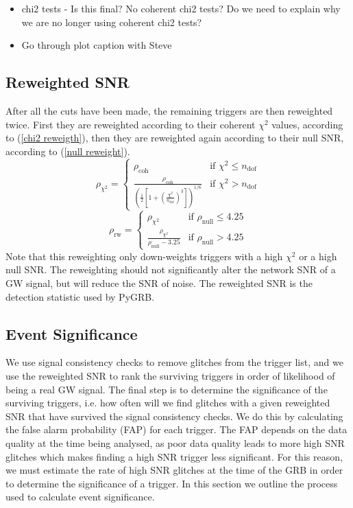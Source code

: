 \documentclass[11pt]{cuthesis}
\begin{document}
\begin{itemize}
\item chi2 tests - Is this final? No coherent chi2 tests? Do we need to explain why we are no longer using coherent chi2 tests? 
\item Go through plot caption with Steve
\end{itemize}

\subsection{Reweighted SNR} \label{sec:reweighted snr}
After all the cuts have been made, the remaining triggers are then reweighted twice. First they are reweighted according to their coherent $\chi^2$ values, according to (\ref{chi2 reweigth}), then they are reweighted again according to their null SNR, according to (\ref{null reweight}).
\begin{equation}  \label{chi2 reweigth}
\rho_{\chi^2} = \begin{cases} \rho_\text{coh} & \mbox{if } \chi^2 \leq n_\text{dof} \\ \frac{\rho_\text{coh}}{\left( \frac{1}{2} \left[ 1 + \left( \frac{\chi^2}{n_\text{dof}} \right)^3 \right] \right)^{1/6} } & \mbox{if } \chi^2 > n_\text{dof}\end{cases}
\end{equation}  
\begin{equation} \label{null reweight}
\rho_\text{rw} = \begin{cases} \rho_{\chi^2} & \mbox{if } \rho_\text{null} \leq 4.25 \\ \frac{\rho_{\chi^2}}{ \rho_\text{null} -3.25} & \mbox{if } \rho_\text{null} > 4.25\end{cases}
\end{equation}
Note that this reweighting only down-weights triggers with a high $\chi^2$ or a high null SNR. The reweighting should not significantly alter the network SNR of a GW signal, but will reduce the SNR of noise. The reweighted SNR is the detection statistic used by PyGRB. 





\subsection{Event Significance} 
We use signal consistency checks to remove glitches from the trigger list, and we use the reweighted SNR to rank the surviving triggers in order of likelihood of being a real GW signal. The final step is to determine the significance of the surviving triggers, i.e. how often will we find glitches with a given reweighted SNR that have survived the signal consistency checks. We do this by calculating the false alarm probability (FAP) for each trigger. The FAP depends on the data quality at the time being analysed, as poor data quality leads to more high SNR glitches which makes finding a high SNR trigger less significant. For this reason, we must estimate the rate of high SNR glitches at the time of the GRB in order to determine the significance of a trigger. In this section we outline the process used to calculate event significance. 
\end{document}
